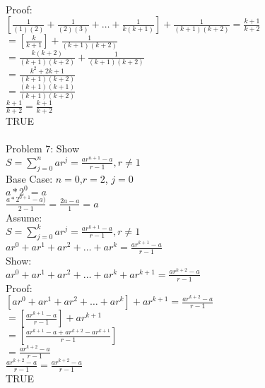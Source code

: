 \documentclass[12pt]{article}
\begin{document}
        \\\indent Proof:
        \\\indent \indent $ [\frac{1}{(1)(2)}+ \frac{1}{(2)(3)}+ \ldots + \frac{1}{k(k+1)}] + \frac{1}{(k+1)(k+2)} = \frac{k+1}{k+2}$
        \\\indent \indent $=[\frac{k}{k+1}] + \frac{1}{(k+1)(k+2)}$
        \\\indent \indent $=\frac{k(k+2)}{(k+1)(k+2)} + \frac{1}{(k+1)(k+2)} $
        \\\indent \indent $=\frac{k^2+2k+1}{(k+1)(k+2)}$
        \\\indent \indent $=\frac{(k+1)(k+1)}{(k+1)(k+2)}$
        \\\indent \indent $\frac{k+1}{k+2}= \frac{k+1}{k+2}$
        \\\indent \indent TRUE 
        \\
        \\Problem 7: Show 
        \\\indent \indent $ S= \sum\limits_{j=0}^n  ar^j= \frac{ar^{n+1}-a}{r-1} , r \neq 1 $
        \\\indent Base Case: $n=0$,$r=2$, $j=0$
        \\\indent \indent $a*2^0 = a $
        \\\indent \indent $\frac{a*2^{0+1}-a)}{2-1} = \frac{2a-a}{1} = a$
        \\\indent Assume:
        \\\indent \indent $ S= \sum\limits_{j=0}^k  ar^j= \frac{ar^{k+1}-a}{r-1} , r \neq 1 $
        \\\indent \indent $ar^0 +ar^1+ar^2+\ldots+ar^k=\frac{ar^{k+1}-a}{r-1}$
        \\\indent Show:
        \\\indent \indent $ar^0 +ar^1+ar^2+\ldots+ar^k+ar^{k+1}=\frac{ar^{k+2}-a}{r-1}$
        \\\indent Proof:
        \\\indent \indent $[ar^0 +ar^1+ar^2+\ldots+ar^k]+ar^{k+1}=\frac{ar^{k+2}-a}{r-1}$
        \\\indent \indent $ =[\frac{ar^{k+1}-a}{r-1}]+ar^{k+1}$
        \\\indent \indent $ =[\frac{ar^{k+1}-a+ar^{k+2}-ar^{k+1}}{r-1}]$
        \\\indent \indent $=\frac{ar^{k+2}-a}{r-1}$
        \\\indent \indent $\frac{ar^{k+2}-a}{r-1}=\frac{ar^{k+2}-a}{r-1}$
        \\\indent \indent TRUE
        \\
\end{document}
